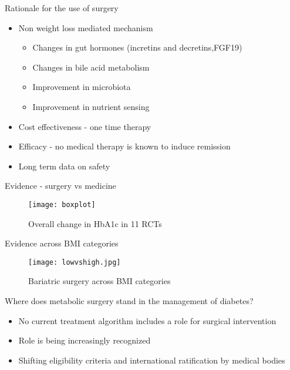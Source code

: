 \documentclass[11pt]{beamer}
\begin{document}
\begin{frame}{Rationale for the use of surgery  }
\begin{itemize}

\item Non weight loss mediated mechanism \pause
    \begin{itemize}
        \item Changes in gut hormones (incretins and decretins,FGF19) 
        \item Changes in bile acid metabolism
        \item Improvement in microbiota
        \item Improvement in nutrient sensing
    \end{itemize}
\item Cost effectiveness - one time therapy \pause
\item Efficacy - no medical therapy is known to induce remission \pause
\item Long term data on safety 	
\end{itemize}
\end{frame} 
\begin{frame}{Evidence - surgery vs medicine  }
 \begin{figure}
 \texttt{[image: boxplot]}
 \caption{Overall change in HbA1c in 11 RCTs}
 \end{figure}
\end{frame} 
\begin{frame}{Evidence across BMI categories  }
 \begin{figure}
 \texttt{[image: lowvshigh.jpg]}
 \caption{Bariatric surgery across BMI categories}
 \end{figure}
\end{frame} 
\begin{frame}{Where does metabolic surgery stand in the management of diabetes?  }
\begin{itemize}

\item No current treatment algorithm includes a role for surgical intervention
\item Role is being increasingly recognized
\item Shifting eligibility criteria and international ratification by medical bodies
	
\end{itemize}

\end{frame} 
\end{document}
